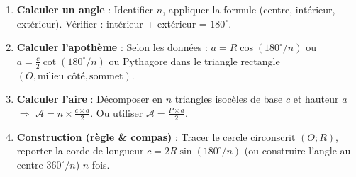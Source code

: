 \documentclass[11pt]{article}
\begin{document}
\begin{bilan}
\begin{enumerate}
  \item \textbf{Calculer un angle} : Identifier $n$, appliquer la formule (centre, intérieur, extérieur). Vérifier : intérieur + extérieur = $180^\circ$.
  \item \textbf{Calculer l'apothème} : Selon les données : $a = R\cos(180^\circ/n)$ ou $a = \frac{c}{2}\cot(180^\circ/n)$ ou Pythagore dans le triangle rectangle $(O, \text{milieu côté}, \text{sommet})$.
  \item \textbf{Calculer l'aire} : Décomposer en $n$ triangles isocèles de base $c$ et hauteur $a$ $\Rightarrow$ $\mathcal{A} = n \times \frac{c \times a}{2}$. Ou utiliser $\mathcal{A} = \frac{P \times a}{2}$.
  \item \textbf{Construction (règle \& compas)} : Tracer le cercle circonscrit $(O; R)$, reporter la corde de longueur $c = 2R\sin(180^\circ/n)$ (ou construire l'angle au centre $360^\circ/n$) $n$ fois.
\end{enumerate}

\end{bilan}
\end{document}
